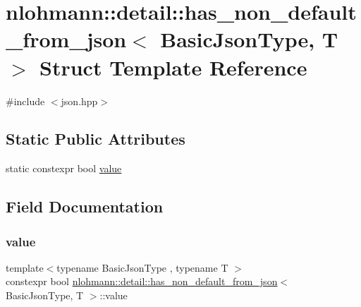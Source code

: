 \hypertarget{structnlohmann_1_1detail_1_1has__non__default__from__json}{}\section{nlohmann\+::detail\+::has\+\_\+non\+\_\+default\+\_\+from\+\_\+json$<$ Basic\+Json\+Type, T $>$ Struct Template Reference}
\label{structnlohmann_1_1detail_1_1has__non__default__from__json}


{\ttfamily \#include $<$json.\+hpp$>$}

\subsection*{Static Public Attributes}
\begin{DoxyCompactItemize}
\item 
static constexpr bool \mbox{\hyperlink{structnlohmann_1_1detail_1_1has__non__default__from__json_ad34bb7cd3961fcafc2c5047a9782e931}{value}}
\end{DoxyCompactItemize}


\subsection{Field Documentation}
\mbox{\label{structnlohmann_1_1detail_1_1has__non__default__from__json_ad34bb7cd3961fcafc2c5047a9782e931}} 
\subsubsection{\texorpdfstring{value}{value}}
{\footnotesize\ttfamily template$<$typename Basic\+Json\+Type , typename T $>$ \\
constexpr bool \mbox{\hyperlink{structnlohmann_1_1detail_1_1has__non__default__from__json}{nlohmann\+::detail\+::has\+\_\+non\+\_\+default\+\_\+from\+\_\+json}}$<$ Basic\+Json\+Type, T $>$\+::value\hspace{0.3cm}{\ttfamily [static]}}

